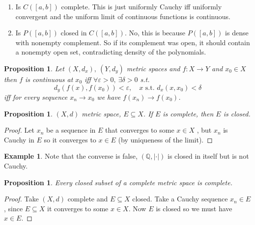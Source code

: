 \documentclass[11pt,a4paper]{article}
\theoremstyle{definition}
\newtheorem{example}[definition]{Example}
\theoremstyle{plain}
\newtheorem{proposition}[definition]{Proposition}
\theoremstyle{remark}
\newcommand{\Q}{\mathbb{Q}}
\newcommand{\abs}[1]{\lvert #1 \rvert}
\newcommand{\1}{\mathbbm{1}}
\begin{document}
\begin{enumerate}[label = \roman*)]
    Note that $x^*$ is bounded because each $x^n$ is bounded in $\ell^\infty$, therefore $\abs{x_{n,i}} \le M, \ \forall n, i$, taking $n \to \infty$ we get that $\abs{x_i} \le M, \ \forall i$.

    \item Is $C([a, b])$ complete. This is just uniformly Cauchy iff uniformly convergent and the uniform limit of continuous functions is continuous.
    
    \item Is $P([a,b])$ closed in $C([a,b])$. No, this is because $P([a,b])$ is dense with nonempty complement. So if its complement was open, it should contain a nonempty open set, contradicting density of 
    the polynomials.
\end{enumerate}

\begin{proposition}
    Let $(X,d_x), \ (Y, d_y)$ metric spaces and $f \colon X \to Y$ and $x_0 \in X$ then $f$ is continuous at $x_0$ iff $\forall \varepsilon > 0, \ \exists \delta > 0$ s.t. 
    $$d_y(f(x), f(x_0)) < \varepsilon, \quad x \text{ s.t. } d_x(x, x_0) < \delta$$
    iff for every sequence $x_n \to x_0$ we have $f(x_n) \to f(x_0)$. 
\end{proposition}

\begin{proposition}
    $(X,d)$ metric space, $E \subseteq X$. If $E$ is complete, then $E$ is closed.
\end{proposition}

\begin{proof}
    Let $x_n$ be a sequence in $E$ that converges to some $x \in X$ , but $x_n$ is Cauchy in $E$ so it converges to $x \in E$ (by uniqueness of the limit).
\end{proof}

\begin{example}
    Note that the converse is false, $(\Q, \abs{\cdot})$ is closed in itself but is not Cauchy.
\end{example}

\begin{proposition}
    Every closed subset of a complete metric space is complete.
\end{proposition}

\begin{proof}
    Take $(X,d)$ complete and $E \subseteq X$ closed. Take a Cauchy sequence $x_n \in E$, since $E \subseteq X$ it converges to some $x \in X$. Now $E$ is closed so we must have $x\in E$. 
\end{proof}
\end{document}
